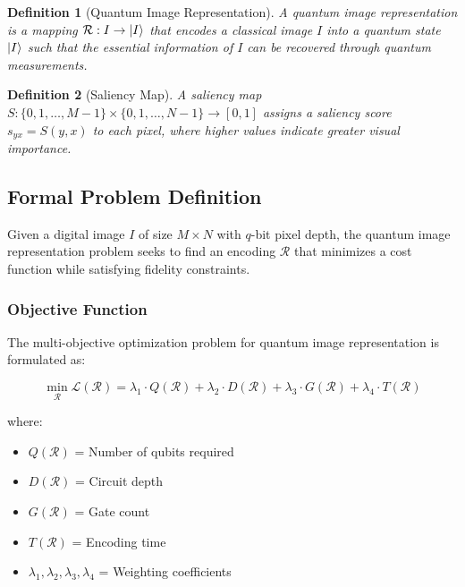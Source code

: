 \documentclass[pdflatex,sn-mathphys-num,Numbered]{sn-jnl}
\theoremstyle{thmstyleone}
\theoremstyle{thmstyletwo}
\theoremstyle{thmstylethree}
\newtheorem{definition}{Definition}
\begin{document}
\begin{definition}[Quantum Image Representation]
A quantum image representation is a mapping $\mathcal{R}: I \rightarrow \ket{I}$ that encodes a classical image $I$ into a quantum state $\ket{I}$ such that the essential information of $I$ can be recovered through quantum measurements.
\end{definition}

\begin{definition}[Saliency Map]
A saliency map $S: \{0, 1, \ldots, M-1\} \times \{0, 1, \ldots, N-1\} \rightarrow [0, 1]$ assigns a saliency score $s_{yx} = S(y, x)$ to each pixel, where higher values indicate greater visual importance.
\end{definition}

\subsection{Formal Problem Definition}

Given a digital image $I$ of size $M \times N$ with $q$-bit pixel depth, the quantum image representation problem seeks to find an encoding $\mathcal{R}$ that minimizes a cost function while satisfying fidelity constraints.

\subsubsection{Objective Function}

The multi-objective optimization problem for quantum image representation is formulated as:

\begin{equation}
\min_{\mathcal{R}} \mathcal{L}(\mathcal{R}) = \lambda_1 \cdot Q(\mathcal{R}) + \lambda_2 \cdot D(\mathcal{R}) + \lambda_3 \cdot G(\mathcal{R}) + \lambda_4 \cdot T(\mathcal{R})
\label{eq:objective}
\end{equation}

where:
\begin{itemize}
\item $Q(\mathcal{R})$ = Number of qubits required
\item $D(\mathcal{R})$ = Circuit depth
\item $G(\mathcal{R})$ = Gate count
\item $T(\mathcal{R})$ = Encoding time
\item $\lambda_1, \lambda_2, \lambda_3, \lambda_4$ = Weighting coefficients
\end{itemize}
\end{document}
